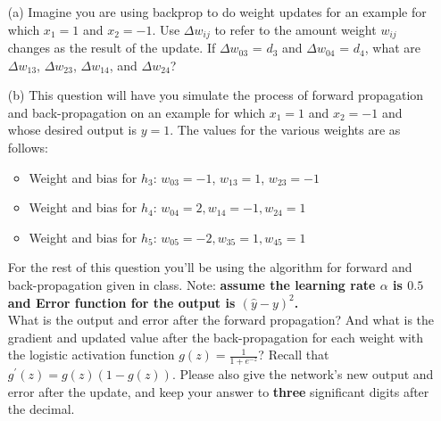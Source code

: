 \begin{itemize}
\item[(a)]Imagine you are using backprop to do weight updates for an example for which $x_1 = 1$ and $x_2 = -1$. Use $\Delta w_{ij}$ to refer to the amount weight $w_{ij}$ changes as the result of the update. If $\Delta w_{03}$ = $d_3$ and $\Delta w_{04}$ = $d_4$, what are $\Delta w_{13}$, $\Delta w_{23}$, $\Delta w_{14}$, and $\Delta w_{24}$? 

\item[(b)] This question will have you simulate the process of forward propagation and back-propagation on an example for which $x_1 = 1$ and $x_2 = -1$ and whose desired output is $y = 1$. The values for the various weights are as follows:
\begin{itemize}
\item Weight and bias for $h_3$: $w_{03} = -1$, $w_{13} = 1$, $w_{23} = -1$
\item Weight and bias for $h_4$: $w_{04} = 2, w_{14} = -1, w_{24} = 1$
\item Weight and bias for $h_5$: $w_{05} = -2, w_{35} = 1, w_{45} = 1$
\end{itemize}
For the rest of this question you'll be using the algorithm for forward and back-propagation given in class. Note: \textbf{assume the learning rate $\alpha$ is $0.5$ and Error function for the output is $(\hat{y}-y)^2$.}\\

What is the output and error after the forward propagation? And what is the gradient and updated value after the back-propagation for each weight with the logistic activation function $g(z)=\frac{1}{1+e^{-z}}$? Recall that $g^{\prime}(z)=g(z)(1-g(z))$. Please also give the network's new output and error after the update, and keep your answer to \textbf{three} significant digits after the decimal. 
\end{itemize}

\solution






\newpage